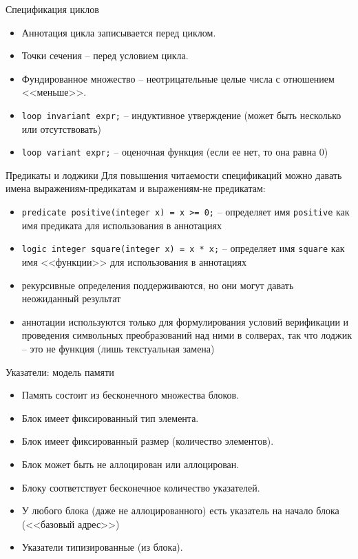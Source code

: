 \documentclass[hyperref={unicode=true}]{beamer}
\begin{document}
    \begin{frame}[fragile]{Спецификация циклов}
    \begin{itemize}
    \item
    Аннотация цикла записывается перед циклом.
    \item
    Точки сечения -- перед условием цикла.
    \item
    Фундированное множество -- неотрицательные целые числа
    с отношением <<меньше>>.
    \item
    \verb|loop invariant expr;| -- индуктивное утверждение
    (может быть несколько или отсутствовать)
    \item
    \verb|loop variant expr;| -- оценочная функция
    (если ее нет, то она равна 0)
    \end{itemize}
    \end{frame}

    \begin{frame}[fragile]{Предикаты и лоджики}
    Для повышения читаемости спецификаций можно давать имена
    выражениям-предикатам и выражениям-не предикатам:
    \begin{itemize}
    \item
    \verb|predicate positive(integer x) = x >= 0;| --
    определяет имя \verb|positive| как имя предиката для использования в аннотациях
    \item
    \verb|logic integer square(integer x) = x * x;| --
    определяет имя \verb|square| как имя <<функции>> для использования в аннотациях
    \item
    рекурсивные определения поддерживаются, но они могут давать неожиданный результат
    \item
    аннотации используются только для формулирования условий
    верификации и проведения символьных преобразований над ними
    в солверах, так что лоджик -- это не функция (лишь текстуальная замена)
    \end{itemize}
    \end{frame}

    \begin{frame}{Указатели: модель памяти}
    \begin{itemize}
    \item
    Память состоит из бесконечного множества блоков.
    \item    
    Блок имеет фиксированный тип элемента.
    \item
    Блок имеет фиксированный размер (количество элементов).
    \item
    Блок может быть не аллоцирован или аллоцирован.
    \item
    Блоку соответствует бесконечное количество указателей.
    \item
    У любого блока (даже не аллоцированного) есть указатель на начало блока
    (<<базовый адрес>>)
    \item
    Указатели типизированные (из блока).
    \end{itemize}
    \end{frame}
\end{document}
